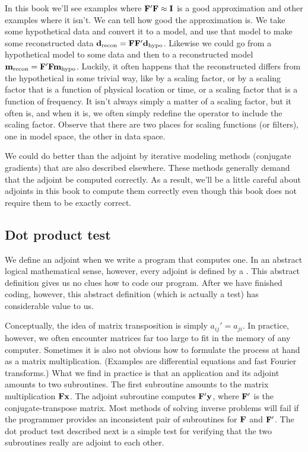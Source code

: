 \par
In this book we'll see examples where
$\bold F'\bold F\approx \bold I$
is a good approximation and other examples where it isn't.
We can tell how good the approximation is.
We take some hypothetical data and convert it to a model,
and use that model to make some reconstructed data
$\bold d_{\rm recon} = \bold F \bold F' \bold d_{\rm hypo}$.
Likewise we could go from a hypothetical model to some data and then
to a reconstructed model
$\bold m_{\rm recon} = \bold F' \bold F \bold m_{\rm hypo}$.
Luckily, it often happens that the reconstructed differs from
the hypothetical in some trivial way,
like by a scaling factor, or by a scaling factor
that is a function of physical location or time,
or a scaling factor that is a function of frequency.
It isn't always simply a matter of a scaling factor,
but it often is, and when it is, we often simply
redefine the operator to include the scaling factor.
Observe that there are two places for scaling functions (or filters),
one in model space, the other in data space.

\par
We could do better than the adjoint
by iterative modeling methods (conjugate gradients)
that are also described elsewhere.
These methods generally demand that the adjoint be computed correctly.
As a result, we'll be a little careful about adjoints in
this book to compute them correctly
even though this book does not require them to be exactly correct.

\subsection{Dot product test}

\par
We define an adjoint when we write a program that computes one.
In an abstract logical mathematical sense, however,
every adjoint is defined by a .
This abstract definition gives us no clues how to code our program.
After we have finished coding, however, this abstract definition
(which is actually a test) has considerable value to us.


\par
Conceptually, the idea of matrix transposition is simply ${a}_{ij}'=a_{ji}$.
In practice, however, we often encounter matrices far too large
to fit in the memory of any computer.
Sometimes it is also not obvious how to formulate the process at hand
as a matrix multiplication.
(Examples are differential equations and fast Fourier transforms.)
What we find in practice is that an application and its adjoint
amounts to two subroutines. The first subroutine
amounts to the matrix multiplication $ \bold F \bold x$.
The adjoint subroutine computes $\bold F' \bold y$,
where $\bold F'$ is the conjugate-transpose matrix.
Most methods of solving inverse problems will fail
if the programmer provides an inconsistent pair of subroutines
for $\bold F$ and $\bold F'$.
The dot product test described next
is a simple test for verifying that the two
subroutines really are adjoint to each other.

